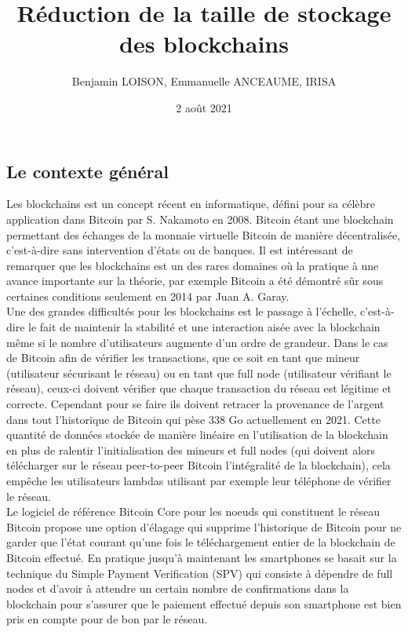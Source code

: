 \documentclass{article}
\newenvironment{point}[1]%
{\subsection*{#1}}%
{}
\begin{document}
\title{Réduction de la taille de stockage des blockchains}

\author{Benjamin LOISON, Emmanuelle ANCEAUME, IRISA}

\date{2 août 2021}

\maketitle

\pagestyle{empty}
\thispagestyle{empty}


\begin{point}{Le contexte général}
  
	Les blockchains est un concept récent en informatique, défini pour sa célèbre application dans Bitcoin par S. Nakamoto en 2008. Bitcoin étant une blockchain permettant des échanges de la monnaie virtuelle Bitcoin de manière décentralisée, c'est-à-dire sans intervention d'états ou de banques. Il est intéressant de remarquer que les blockchains est un des rares domaines où la pratique à une avance importante sur la théorie, par exemple Bitcoin a été démontré sûr sous certaines conditions seulement en 2014 par Juan A. Garay.\\
	Une des grandes difficultés pour les blockchains est le passage à l'échelle, c'est-à-dire le fait de maintenir la stabilité et une interaction aisée avec la blockchain même si le nombre d'utilisateurs augmente d'un ordre de grandeur. Dans le cas de Bitcoin afin de vérifier les transactions, que ce soit en tant que mineur (utilisateur sécurisant le réseau) ou en tant que full node (utilisateur vérifiant le réseau), ceux-ci doivent vérifier que chaque transaction du réseau est légitime et correcte. Cependant pour se faire ils doivent retracer la provenance de l'argent dans tout l'historique de Bitcoin qui pèse 338 Go actuellement en 2021. Cette quantité de données stockée de manière linéaire en l'utilisation de la blockchain en plus de ralentir l'initialisation des mineurs et full nodes (qui doivent alors télécharger sur le réseau peer-to-peer Bitcoin l'intégralité de la blockchain), cela empêche les utilisateurs lambdas utilisant par exemple leur téléphone de vérifier le réseau.\\
	Le logiciel de référence Bitcoin Core pour les noeuds qui constituent le réseau Bitcoin propose une option d'élagage qui supprime l'historique de Bitcoin pour ne garder que l'état courant qu'une fois le téléchargement entier de la blockchain de Bitcoin effectué. 
	En pratique jusqu'à maintenant les smartphones se basait sur la technique du Simple Payment Verification (SPV) qui consiste à dépendre de full nodes et d'avoir à attendre un certain nombre de confirmations dans la blockchain pour s'assurer que le paiement effectué depuis son smartphone est bien pris en compte pour de bon par le réseau.
	

\end{point}
\end{document}
